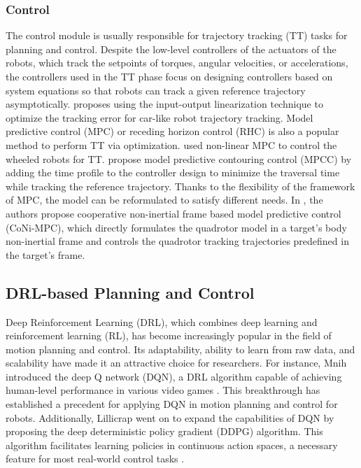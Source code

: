 \documentclass[letterpaper,journal,twoside]{IEEEtran}
\begin{document}
\subsubsection{Control}
The control module is usually responsible for trajectory 
tracking (TT) tasks for planning and control.
Despite the low-level controllers of the actuators of the 
robots, which track the setpoints of torques, angular 
velocities, or accelerations, the controllers used in the TT
phase focus on designing controllers based on system
equations so that robots can track a given reference 
trajectory asymptotically. 
\cite{majd2019stable} proposes using the input-output 
linearization technique to optimize the tracking error for
car-like robot trajectory tracking.
Model predictive control (MPC) or receding horizon control (RHC)
is also a popular method to perform TT via optimization.
\cite{kunhe2005mobile} used non-linear MPC to control the 
wheeled robots for TT.
\cite{romero2022model,ji2021cmpcc} propose model predictive
contouring control (MPCC) by adding the time profile to the 
controller design to minimize the traversal time while tracking
the reference trajectory.
Thanks to the flexibility of the framework of MPC, the model 
can be reformulated to satisfy different needs. 
In \cite{zhang2023coni}, the authors propose cooperative 
non-inertial frame based model predictive control (CoNi-MPC), 
which directly formulates the quadrotor model in a target's 
body non-inertial frame and controls the quadrotor tracking 
trajectories predefined in the target's frame.

\subsection{DRL-based Planning and Control}
Deep Reinforcement Learning (DRL), which combines deep learning 
and reinforcement learning (RL), 
has become increasingly popular in the field of motion planning 
and control. 
Its adaptability, ability to learn from raw data, and scalability 
have made it an attractive choice for researchers.
For instance, Mnih \etal introduced the deep Q network (DQN), 
a DRL algorithm capable of achieving human-level performance in various video games \cite{mnih2015human}. 
This breakthrough has established a precedent for applying 
DQN in motion planning and control for robots. 
Additionally, Lillicrap \etal went on to expand the 
capabilities of DQN by proposing the deep deterministic policy 
gradient (DDPG) algorithm. 
This algorithm facilitates learning policies in continuous action 
spaces, a necessary feature for most real-world control tasks 
\cite{lillicrap2015continuous}.
\end{document}
